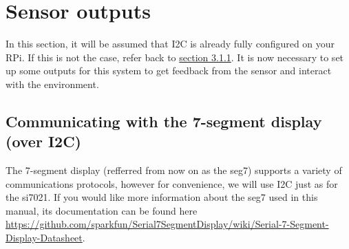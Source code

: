 \documentclass{article}
\begin{document}
\section{Sensor outputs}
  In this section, it will be assumed that I2C is already fully configured on your RPi. If this is not the case, refer back to \hyperref[sec:configuring-i2c]{section 3.1.1}. It is now necessary to set up some outputs for this system to get feedback from the sensor and interact with the environment.
  \subsection{Communicating with the 7-segment display (over I2C)}
  The 7-segment display (refferred from now on as the seg7) supports a variety of communications protocols, however for convenience, we will use I2C just as for the si7021. If you would like more information about the seg7 used in this manual, its documentation can be found here \newline\href{https://github.com/sparkfun/Serial7SegmentDisplay/wiki/Serial-7-Segment-Display-Datasheet}{https://github.com/sparkfun/Serial7SegmentDisplay/wiki/Serial-7-Segment-Display-Datasheet}.
\end{document}
